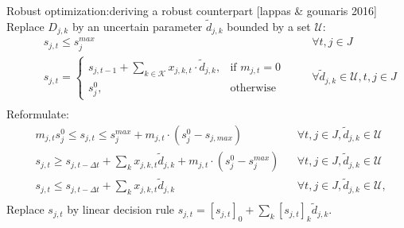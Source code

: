 \documentclass[slides]{beamer}
\begin{document}
\begin{frame}{Robust optimization:deriving a robust counterpart [lappas \& gounaris 2016]}
    Replace $D_{j,k}$ by an uncertain parameter $\tilde{d}_{j,k}$ bounded by a set $\mathcal{U}$:
    \vspace{-10pt}
    \begin{equation*}
    \begin{aligned}
    &
    && s_{j,t} \leq s_{j}^{max}
    &&& \forall t, j \in J\\
    &
    && s_{j,t} =
    \begin{cases}
    s_{j,t-1} + \sum_{k \in \mathcal{K}}{x_{j,k,t}\cdot \tilde{d}_{j,k}}, & \text{if } m_{j,t} = 0\\
    s_{j}^{0}, & \text{otherwise}
    \end{cases}
    &&& \forall \tilde{d}_{j,k} \in \mathcal{U}, t, j \in J\\
    \end{aligned}
    \end{equation*}
    \vspace{-5pt}
    Reformulate:
    \vspace{-5pt}
    \begin{equation*}
    \begin{aligned}
    & m_{j,t} s_{j}^{0} \leq s_{j,t} \leq s_{j}^{max} + m_{j,t} \cdot (s_{j}^{0} - s_{j,max})
    && \forall t, j \in J, \tilde{d}_{j,k} \in \mathcal{U}\\
    & s_{j,t} \geq s_{j,t-\Delta t} + \sum_{k}{x_{j,k,t}\tilde{d}_{j,k}} + m_{j,t} \cdot (s_{j}^{0} - s_{j}^{max})
    && \forall t, j \in J, \tilde{d}_{j,k} \in \mathcal{U}\\
    & s_{j,t} \leq s_{j,t-\Delta t} + \sum_{k}{x_{j,k,t}\tilde{d}_{j,k}}
    && \forall t, j \in J, \tilde{d}_{j,k} \in \mathcal{U},\\
    \end{aligned}
    \end{equation*}
Replace $s_{j,t}$ by linear decision rule $s_{j,t} = [s_{j,t}]_{0} + \sum_{k}{[s_{j,t}]_{k}\tilde{d}_{j,k}}$.
\end{frame}
\end{document}
